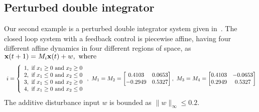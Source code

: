 
%
\subsection{Perturbed double integrator}
Our second example is a perturbed double integrator system given
in~\cite{rakovic2004computation}.  The closed loop system with a
feedback control is piecewise affine, having four different affine
dynamics in four different regions of space, as
${\bf x}(t+1)=M_i{\bf x}(t)+w,~\text{where}~$
{\scriptsize
\begin{align*}~\label{eqn:pwa-regions}
i=\left\{\begin{array}{l}
1,~\text{if}~x_1\geq 0~\text{and}~x_2\geq 0\\
2,~\text{if}~x_1\leq 0~\text{and}~x_2\leq 0\\
3,~\text{if}~x_1\leq 0~\text{and}~x_2\geq 0\\
4,~\text{if}~x_1\geq 0~\text{and}~x_2\leq 0\\
\end{array} \right.,
~M_1=M_2=\left[\begin{matrix}
0.4103  &  0.0653\\
   -0.2949  &  0.5327
\end{matrix}\right],~M_3=M_4=\left[\begin{matrix}
0.4103  &  -0.0653\\
   0.2949  &  0.5327
\end{matrix}\right]
\end{align*}}
%
The additive disturbance input $w$ is bounded as $\|w\|_{\infty}\leq
0.2$.  

